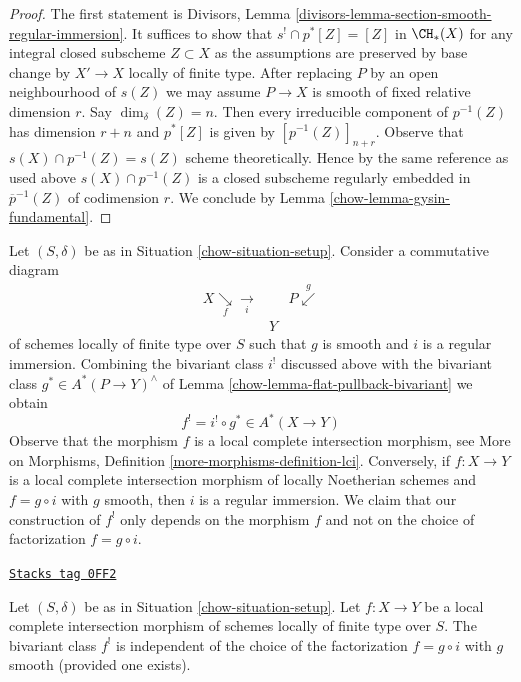 \begin{proof}

The first statement is Divisors, Lemma
\ref{divisors-lemma-section-smooth-regular-immersion}.
It suffices to show that $s^! \cap p^*[Z] = [Z]$ in
$\CH_*(X)$ for any integral closed subscheme $Z \subset X$
as the assumptions are preserved by base change by $X' \to X$
locally of finite type. After replacing $P$ by an open neighbourhood
of $s(Z)$ we may assume $P \to X$ is smooth of fixed relative dimension $r$.
Say $\dim_\delta(Z) = n$. Then every irreducible component of $p^{-1}(Z)$
has dimension $r + n$ and $p^*[Z]$ is given by $[p^{-1}(Z)]_{n + r}$.
Observe that $s(X) \cap p^{-1}(Z) = s(Z)$ scheme theoretically. Hence by the
same reference as used above $s(X) \cap p^{-1}(Z)$ is a closed subscheme
regularly embedded in $\overline{p}^{-1}(Z)$ of codimension $r$.
We conclude by Lemma \ref{chow-lemma-gysin-fundamental}.
\end{proof}

Let $(S, \delta)$ be as in Situation \ref{chow-situation-setup}. Consider a
commutative diagram
$$
\begin{array}{ccc}X \underset{f}{\searrow}\underset{i}{\longrightarrow} &  & P \overset{g}{\swarrow} \\  & Y & \end{array}
$$
of schemes locally of finite type over $S$ such that $g$ is smooth
and $i$ is a regular immersion. Combining the bivariant class
$i^!$ discussed above with the bivariant class $g^* \in A^*(P \to Y)^\wedge$
of Lemma \ref{chow-lemma-flat-pullback-bivariant} we obtain
$$
f^! = i^! \circ g^* \in A^*(X \to Y)
$$
Observe that the morphism $f$ is a local complete intersection morphism, see
More on Morphisms, Definition \ref{more-morphisms-definition-lci}.
Conversely, if $f : X \to Y$ is a local complete intersection morphism
of locally Noetherian schemes and $f = g \circ i$ with $g$ smooth, then
$i$ is a regular immersion. We claim that our construction of $f^!$
only depends on the morphism $f$ and not on the choice of factorization
$f = g \circ i$.

\begin{lemma}
\label{chow-lemma-lci-gysin-well-defined}
\href{https://stacks.math.columbia.edu/tag/0FF2}{\texttt{Stacks tag 0FF2}}

Let $(S, \delta)$ be as in Situation \ref{chow-situation-setup}.
Let $f : X \to Y$ be a local complete intersection morphism
of schemes locally of finite type over $S$.
The bivariant class $f^!$ is independent of the choice of
the factorization $f = g \circ i$ with $g$ smooth (provided
one exists).
\end{lemma}

